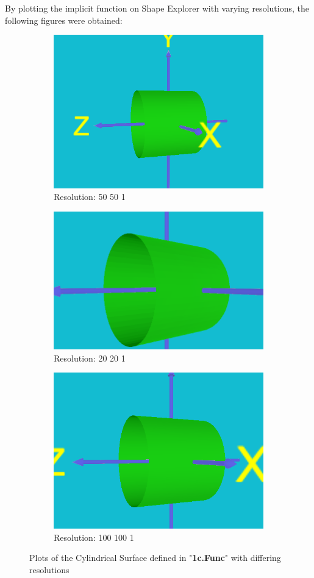 \documentclass[acmlarge,nonacm=true]{acmart}
\begin{document}
By plotting the implicit function on Shape Explorer with varying resolutions, the following figures were obtained:
\begin{figure}[H]
	\begin{subfigure}{.33\textwidth}
	  \centering
	  \includegraphics[width=.8\linewidth]{fig/1c50_50_1}
	  \caption{Resolution: 50 50 1}
	\end{subfigure}%
	\begin{subfigure}{.33\textwidth}
	  \centering
	  \includegraphics[width=.8\linewidth]{fig/1c20_20_1}
	  \caption{Resolution: 20 20 1}
	\end{subfigure}
	\begin{subfigure}{.33\textwidth}
		\centering
		\includegraphics[width=.8\linewidth]{fig/1c100_100_1}
		\caption{Resolution: 100 100 1}
	  \end{subfigure}
	\caption{Plots of the Cylindrical Surface defined in "\textbf{1c.Func}" with differing resolutions}
	\label{fig:1c}
\end{figure}
\end{document}
